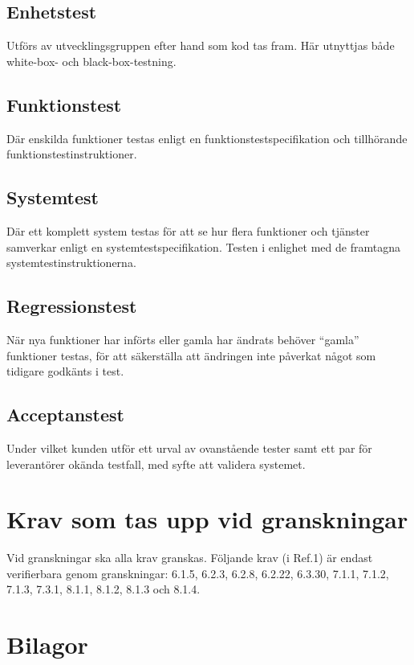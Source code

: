 \documentclass[a4paper]{article}
\begin{document}
\subsection{Enhetstest}

Utförs av utvecklingsgruppen efter hand som kod tas fram. Här utnyttjas både white-box- och black-box-testning.

\subsection{Funktionstest}

Där enskilda funktioner testas enligt en funktionstestspecifikation och tillhörande funktionstestinstruktioner. 

\subsection{Systemtest}

Där ett komplett system testas för att se hur flera funktioner och tjänster samverkar enligt en systemtestspecifikation. Testen i enlighet med de framtagna systemtestinstruktionerna. 

\subsection{Regressionstest}

När nya funktioner har införts eller gamla har ändrats behöver ``gamla'' funktioner testas, för att säkerställa att ändringen inte påverkat något som tidigare godkänts i test.

\subsection{Acceptanstest}

Under vilket kunden utför ett urval av ovanstående tester samt ett par för leverantörer okända testfall, med syfte att validera systemet.

\section{Krav som tas upp vid granskningar}



Vid granskningar ska alla krav granskas.
Följande krav (i Ref.1) är endast verifierbara genom granskningar: 6.1.5, 6.2.3, 6.2.8, 6.2.22, 6.3.30, 7.1.1, 7.1.2, 7.1.3, 7.3.1, 8.1.1, 8.1.2, 8.1.3 och 8.1.4.

\section{Bilagor}
\end{document}

